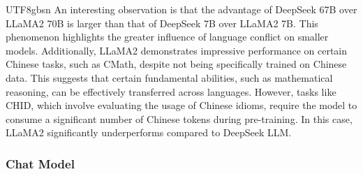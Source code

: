 \documentclass[11pt, a4paper, logo, copyright, nonumbering]{deepseek}
\begin{document}
\begin{CJK*}{UTF8}{gbsn}
An interesting observation is that the advantage of DeepSeek 67B over LLaMA2 70B is larger than that of DeepSeek 7B over LLaMA2 7B. This phenomenon highlights the greater influence of language conflict on smaller models. Additionally, LLaMA2 demonstrates impressive performance on certain Chinese tasks, such as CMath, despite not being specifically trained on Chinese data. This suggests that certain fundamental abilities, such as mathematical reasoning, can be effectively transferred across languages. However, tasks like CHID, which involve evaluating the usage of Chinese idioms, require the model to consume a significant number of Chinese tokens during pre-training. In this case, LLaMA2 significantly underperforms compared to DeepSeek LLM.

\subsubsection{Chat Model}

\begin{table}[t]
    \centering \small
{}
\end{table}
\end{CJK*}
\end{document}
